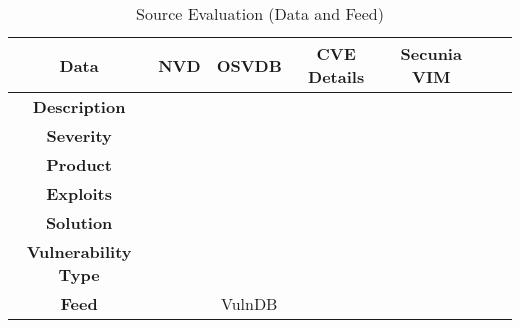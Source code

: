 \begin{table}
\begin{center}
    \begin{tabular}{ | c || c | c | c | c | c | c |}
    
    \hline
	 
      Data & \textbf{NVD}  &  \textbf{OSVDB} & \textbf{CVE Details} & \textbf{Secunia VIM} 
	\\ 
	\hline  
	\hhline{~|*4-}  
	\textbf{Description} & \multicolumn{1}{|c|}{\cellcolor{green!25}\cmark} & \multicolumn{1}{|c|}{\cellcolor{green!25}\cmark}
	& \multicolumn{1}{|c|}{\cellcolor{green!25}\cmark}& \multicolumn{1}{|c|}{\cellcolor{green!25}\cmark}
    \\ 
	\hline   
	\hhline{~|*4-} 
	 \textbf{Severity} & \multicolumn{1}{|c|}{\cellcolor{green!25}\cmark} & \multicolumn{1}{|c|}{\cellcolor{green!25}\cmark}
	& \multicolumn{1}{|c|}{\cellcolor{green!25}\cmark}& \multicolumn{1}{|c|}{\cellcolor{green!25}\cmark}
	  \\ 
	\hline
	\hhline{~|*4-} 
	 \textbf{Product} & \multicolumn{1}{|c|}{\cellcolor{green!25}\cmark} & \multicolumn{1}{|c|}{\cellcolor{green!25}\cmark}
	& \multicolumn{1}{|c|}{\cellcolor{green!25}\cmark}& \multicolumn{1}{|c|}{\cellcolor{green!25}\cmark}
	  \\ 
	\hline
	\hhline{~|*4-} 
	 \textbf{Exploits} & \multicolumn{1}{|c|}{\cellcolor{red!25}\xmark} & \multicolumn{1}{|c|}{\cellcolor{red!25}\xmark}
	& \multicolumn{1}{|c|}{\cellcolor{green!25}\cmark}& \multicolumn{1}{|c|}{\cellcolor{red!25}\xmark}
	  \\ 
	\hline 
	\hhline{~|*4-} 
	 \textbf{Solution} & \multicolumn{1}{|c|}{\cellcolor{red!25}\xmark} & \multicolumn{1}{|c|}{\cellcolor{green!25}\cmark}
	& \multicolumn{1}{|c|}{\cellcolor{red!25}\xmark}& \multicolumn{1}{|c|}{\cellcolor{green!25}\cmark}
	  \\ 
	\hline 
	\hhline{~|*4-} 
	 \textbf{Vulnerability Type} & \multicolumn{1}{|c|}{\cellcolor{green!25}\cmark} & \multicolumn{1}{|c|}{\cellcolor{green!25}\cmark}
	& \multicolumn{1}{|c|}{\cellcolor{green!25}\cmark}& \multicolumn{1}{|c|}{\cellcolor{green!25}\cmark}
	 \\
	 \hline	 
\hhline{~|*4-} 
	 \textbf{Feed} & \multicolumn{1}{|c|}{\cellcolor{green!25}\cmark} & \multicolumn{1}{|c|}{\cellcolor{yellow!25}VulnDB}
	& \multicolumn{1}{|c|}{\cellcolor{yellow!25}\cmark}& \multicolumn{1}{|c|}{\cellcolor{yellow!25}\cmark}
	 \\
	 \hline
     
\end{tabular}
    \caption{Source Evaluation (Data and Feed)}
    \label{table:source_evaluation}
   \end{center}
    \end{table}
     
